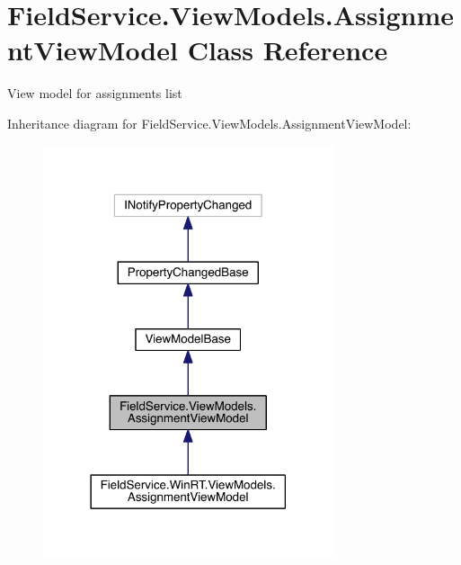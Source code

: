 \hypertarget{class_field_service_1_1_view_models_1_1_assignment_view_model}{\section{Field\+Service.\+View\+Models.\+Assignment\+View\+Model Class Reference}
\label{class_field_service_1_1_view_models_1_1_assignment_view_model}
}


View model for assignments list  




Inheritance diagram for Field\+Service.\+View\+Models.\+Assignment\+View\+Model\+:
\nopagebreak
\begin{figure}[H]
\begin{center}
\leavevmode
\includegraphics[width=242pt]{class_field_service_1_1_view_models_1_1_assignment_view_model__inherit__graph}
\end{center}
\end{figure}


